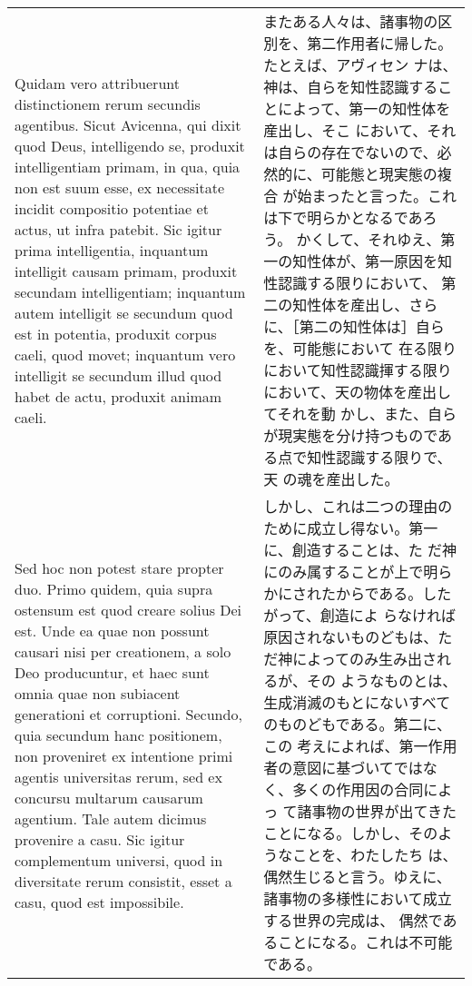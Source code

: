 \documentclass[10pt]{jsarticle} %
\begin{document}
\begin{longtable}{p{21em}p{21em}}
Quidam vero attribuerunt distinctionem rerum secundis
 agentibus. Sicut Avicenna, qui dixit quod Deus, intelligendo se,
 produxit intelligentiam primam, in qua, quia non est suum esse, ex
 necessitate incidit compositio potentiae et actus, ut infra
 patebit. Sic igitur prima intelligentia, inquantum intelligit causam
 primam, produxit secundam intelligentiam; inquantum autem intelligit se
 secundum quod est in potentia, produxit corpus caeli, quod movet;
 inquantum vero intelligit se secundum illud quod habet de actu,
 produxit animam caeli. 

&

またある人々は、諸事物の区別を、第二作用者に帰した。たとえば、アヴィセン
 ナは、神は、自らを知性認識することによって、第一の知性体を産出し、そこ
 において、それは自らの存在でないので、必然的に、可能態と現実態の複合
 が始まったと言った。これは下で明らかとなるであろう。
かくして、それゆえ、第一の知性体が、第一原因を知性認識する限りにおいて、
 第二の知性体を産出し、さらに、［第二の知性体は］自らを、可能態において
 在る限りにおいて知性認識揮する限りにおいて、天の物体を産出してそれを動
 かし、また、自らが現実態を分け持つものである点で知性認識する限りで、天
 の魂を産出した。


\\


Sed hoc non potest stare propter duo. Primo
 quidem, quia supra ostensum est quod creare solius Dei est. Unde ea
 quae non possunt causari nisi per creationem, a solo Deo producuntur,
 et haec sunt omnia quae non subiacent generationi et
 corruptioni. Secundo, quia secundum hanc positionem, non proveniret ex
 intentione primi agentis universitas rerum, sed ex concursu multarum
 causarum agentium. Tale autem dicimus provenire a casu. Sic igitur
 complementum universi, quod in diversitate rerum consistit, esset a
 casu, quod est impossibile. 

&

しかし、これは二つの理由のために成立し得ない。第一に、創造することは、た
だ神にのみ属することが上で明らかにされたからである。したがって、創造によ
らなければ原因されないものどもは、ただ神によってのみ生み出されるが、その
ようなものとは、生成消滅のもとにないすべてのものどもである。第二に、この
考えによれば、第一作用者の意図に基づいてではなく、多くの作用因の合同によっ
て諸事物の世界が出てきたことになる。しかし、そのようなことを、わたしたち
は、偶然生じると言う。ゆえに、諸事物の多様性において成立する世界の完成は、
偶然であることになる。これは不可能である。


\\



\end{longtable}
\end{document}
